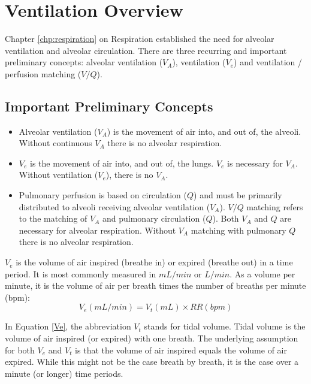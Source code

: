 \section{Ventilation Overview}

Chapter \ref{chp:respiration} on Respiration established the need for alveolar ventilation and alveolar circulation. There are three recurring and important preliminary concepts: alveolar ventilation ($V_A$), ventilation ($V_e$) and ventilation / perfusion matching ($V/Q$).

\subsection{Important Preliminary Concepts}

\begin{itemize}
    \item Alveolar ventilation ($V_A$) is the movement of air into, and out of, the alveoli. Without continuous $V_A$ there is no alveolar respiration. 
    \item $V_e$ is the movement of air into, and out of, the lungs. $V_e$ is necessary for $V_A$. Without ventilation ($V_e$), there is no $V_A$. \item Pulmonary perfusion is based on circulation ($Q$) and must be primarily distributed to alveoli receiving alveolar ventilation ($V_A$). $V/Q$ matching refers to the matching of $V_A$ and pulmonary circulation ($Q$). Both $V_A$ and $Q$ are necessary for alveolar respiration. Without $V_A$ matching with pulmonary $Q$ there is no alveolar respiration.
 \end{itemize}

$V_e$ is the volume of air inspired (breathe in) or expired (breathe out) in a time period. It is most commonly measured in $mL/min$ or $L/min$. As a volume per minute, it is the volume of air per breath times the number of breaths per minute (bpm):
\vspace{3mm}
\begin{equation}
    V_e (mL/min) = V_t (mL) \times RR (bpm)
    \label{Ve}
\end{equation}
\vspace{3mm}

In Equation \ref{Ve}, the abbreviation $V_t$ stands for tidal volume. Tidal volume is the volume of air inspired (or expired) with one breath. The underlying assumption for both $V_e$ and $V_t$ is that the volume of air inspired equals the volume of air expired. While this might not be the case breath by breath, it is the case over a minute (or longer) time periods.\footnotemark{}
\vspace{.5cm} 

